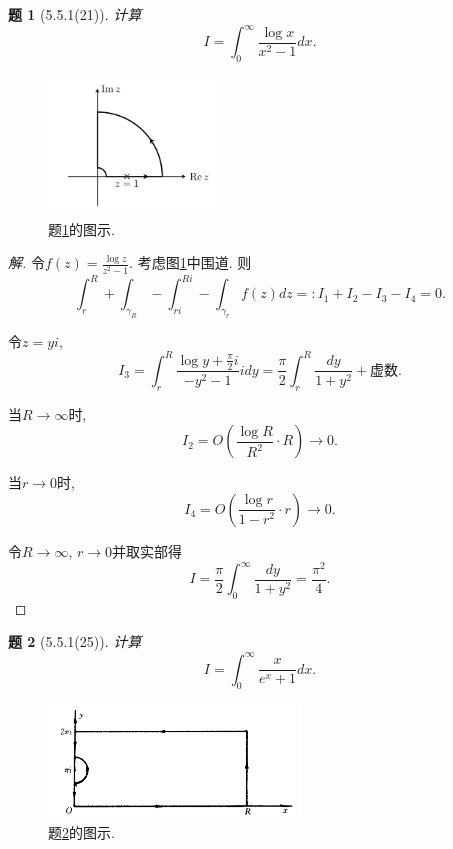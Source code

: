 \documentclass{article}[a4paper, 12pt]
\theoremstyle{mystyle}
\newtheorem{problem}{题}
\newenvironment{solution}{\begin{proof}[解]}{\end{proof}}
\begin{document}
\begin{problem}[5.5.1(21)]\label{21}
  计算\[I=\int_0^\infty \frac{\log x}{x^2-1}dx.\]
\end{problem}

\begin{figure}[htbp]
  \centering
  \includegraphics[width=0.4\textwidth]{images/21.png}
  \caption{题\ref{21}的图示.}
  \label{fig:21}
\end{figure}

\begin{solution}
  令\(f(z)=\frac{\log z}{z^2-1}\). 考虑图\ref{fig:21}中围道. 则\[\int_{r}^{R}+\int_{\gamma_R}-\int_{ri}^{Ri}-\int_{\gamma_r} f(z)dz=:I_1+I_2-I_3-I_4=0.\]

  令\(z=yi\), \[I_3=\int_r^R\frac{\log y+\frac{\pi}{2}i}{-y^2-1}idy=\frac{\pi}{2}\int_r^R\frac{dy}{1+y^2}+\text{虚数}.\]

  当\(R\to\infty\)时, \[I_2=O\left(\frac{\log R}{R^2}\cdot R\right)\to0.\]

  当\(r\to0\)时, \[I_4=O\left(\frac{\log r}{1-r^2}\cdot r\right)\to0.\]

  令\(R\to\infty\), \(r\to0\)并取实部得\[I=\frac{\pi}{2}\int_0^\infty\frac{dy}{1+y^2}=\frac{\pi^2}{4}.\tag*{\(\qed\)}\]
  \renewcommand{\qedsymbol}{}
\end{solution}

\begin{problem}[5.5.1(25)] \label{25}
  计算\[I=\int_0^\infty \frac{x}{e^x+1}dx.\]
\end{problem}

\begin{figure}[htbp]
  \centering
  \includegraphics[width=0.6\textwidth]{images/25.png}
  \caption{题\ref{25}的图示.}
  \label{fig:25}
\end{figure}
\end{document}
